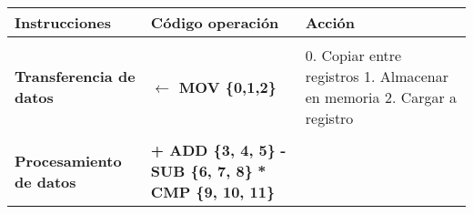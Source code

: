\documentclass[12pt,twoside]{templates/unerthesis}
\begin{document}
\begin{longtable}[]{@{}lll@{}}
\toprule
\begin{minipage}[b]{0.30\columnwidth}\raggedright
Instrucciones\strut
\end{minipage} & \begin{minipage}[b]{0.30\columnwidth}\raggedright
Código operación\strut
\end{minipage} & \begin{minipage}[b]{0.30\columnwidth}\raggedright
Acción\strut
\end{minipage}\tabularnewline
\midrule
\endhead
\begin{minipage}[t]{0.30\columnwidth}\raggedright
\strut
\end{minipage} & \begin{minipage}[t]{0.30\columnwidth}\raggedright
\strut
\end{minipage} & \begin{minipage}[t]{0.30\columnwidth}\raggedright
\strut
\end{minipage}\tabularnewline
\begin{minipage}[t]{0.30\columnwidth}\raggedright
\textbf{Transferencia de datos}\strut
\end{minipage} & \begin{minipage}[t]{0.30\columnwidth}\raggedright
\textbf{\(\leftarrow\) MOV \{0,1,2\}}\strut
\end{minipage} & \begin{minipage}[t]{0.30\columnwidth}\raggedright
0. Copiar entre registros 1. Almacenar en memoria 2. Cargar a registro\strut
\end{minipage}\tabularnewline
\begin{minipage}[t]{0.30\columnwidth}\raggedright
\strut
\end{minipage} & \begin{minipage}[t]{0.30\columnwidth}\raggedright
\strut
\end{minipage} & \begin{minipage}[t]{0.30\columnwidth}\raggedright
\strut
\end{minipage}\tabularnewline
\begin{minipage}[t]{0.30\columnwidth}\raggedright
\textbf{Procesamiento de datos}\strut
\end{minipage} & \begin{minipage}[t]{0.30\columnwidth}\raggedright
\textbf{+ ADD \{3, 4, 5\}} \textbf{- SUB \{6, 7, 8\}} \textbf{* CMP \{9, 10, 11\}}\strut
\end{minipage} & \begin{minipage}[t]{0.30\columnwidth}\raggedright

\end{minipage}
\end{longtable}
\end{document}
